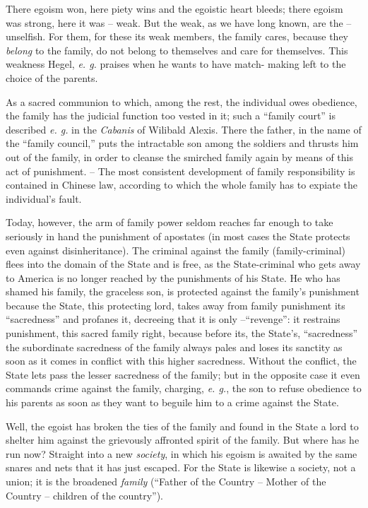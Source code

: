 \documentclass[12pt,a4paper]{book}
\begin{document}
There egoism won, here piety wins and the egoistic heart bleeds; there egoism 
was strong, here it was -- weak. But the weak, as we have long known, are the 
-- unselfish. For them, for these its weak members, the family cares, because 
they \textit{belong} to the family, do not belong to themselves and care for 
themselves. This weakness Hegel, \textit{e. g.} praises when he wants to have 
match- making left to the choice of the parents.

As a sacred communion to which, among the rest, the individual owes obedience, 
the family has the judicial function too vested in it; such a ``family 
court'' is described \textit{e. g.} in the \textit{Cabanis} \textit{}of 
Wilibald Alexis. There the father, in the name of the ``family council,'' 
puts the intractable son among the soldiers and thrusts him out of the family, 
in order to cleanse the smirched family again by means of this act of 
punishment. -- The most consistent development of family responsibility is 
contained in Chinese law, according to which the whole family has to expiate 
the individual's fault.

Today, however, the arm of family power seldom reaches far enough to take 
seriously in hand the punishment of apostates (in most cases the State 
protects even against disinheritance). The criminal against the family 
(family-criminal) flees into the domain of the State and is free, as the 
State-criminal who gets away to America is no longer reached by the 
punishments of his State. He who has shamed his family, the graceless son, is 
protected against the family's punishment because the State, this protecting 
lord, takes away from family punishment its ``sacredness'' and profanes it, 
decreeing that it is only --``revenge'': it restrains punishment, this 
sacred family right, because before its, the State's, ``sacredness'' the 
subordinate sacredness of the family always pales and loses its sanctity as 
soon as it comes in conflict with this higher sacredness. Without the 
conflict, the State lets pass the lesser sacredness of the family; but in the 
opposite case it even commands crime against the family, charging, \textit{e. 
g.}, the son to refuse obedience to his parents as soon as they want to 
beguile him to a crime against the State.

Well, the egoist has broken the ties of the family and found in the State a 
lord to shelter him against the grievously affronted spirit of the family. But 
where has he run now? Straight into a new \textit{society}, in which his 
egoism is awaited by the same snares and nets that it has just escaped. For 
the State is likewise a society, not a union; it is the broadened 
\textit{family} (``Father of the Country -- Mother of the Country -- children 
of the country'').
\end{document}

